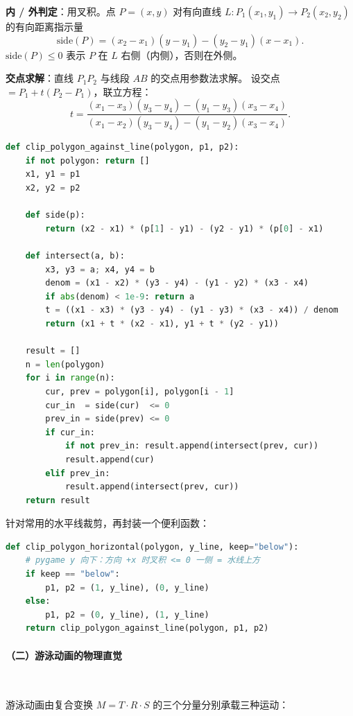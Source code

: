 \documentclass[12pt, a4paper]{article}
\begin{document}
\textbf{内 / 外判定}：用叉积。点 $P = (x, y)$ 对有向直线
$L: P_1(x_1, y_1) \to P_2(x_2, y_2)$ 的有向距离指示量
\[
\mathrm{side}(P) = (x_2 - x_1)(y - y_1) - (y_2 - y_1)(x - x_1).
\]
$\mathrm{side}(P) \le 0$ 表示 $P$ 在 $L$ 右侧（内侧），否则在外侧。

\textbf{交点求解}：直线 $P_1 P_2$ 与线段 $A B$ 的交点用参数法求解。
设交点 $= P_1 + t(P_2 - P_1)$，联立方程：
\[
t = \frac{(x_1 - x_3)(y_3 - y_4) - (y_1 - y_3)(x_3 - x_4)}
        {(x_1 - x_2)(y_3 - y_4) - (y_1 - y_2)(x_3 - x_4)}.
\]

\begin{lstlisting}[language=Python, caption={Sutherland--Hodgman 裁剪（algorithms.py 摘录）}]
def clip_polygon_against_line(polygon, p1, p2):
    if not polygon: return []
    x1, y1 = p1
    x2, y2 = p2

    def side(p):
        return (x2 - x1) * (p[1] - y1) - (y2 - y1) * (p[0] - x1)

    def intersect(a, b):
        x3, y3 = a; x4, y4 = b
        denom = (x1 - x2) * (y3 - y4) - (y1 - y2) * (x3 - x4)
        if abs(denom) < 1e-9: return a
        t = ((x1 - x3) * (y3 - y4) - (y1 - y3) * (x3 - x4)) / denom
        return (x1 + t * (x2 - x1), y1 + t * (y2 - y1))

    result = []
    n = len(polygon)
    for i in range(n):
        cur, prev = polygon[i], polygon[i - 1]
        cur_in  = side(cur)  <= 0
        prev_in = side(prev) <= 0
        if cur_in:
            if not prev_in: result.append(intersect(prev, cur))
            result.append(cur)
        elif prev_in:
            result.append(intersect(prev, cur))
    return result
\end{lstlisting}

针对常用的水平线裁剪，再封装一个便利函数：

\begin{lstlisting}[language=Python, caption={水平线裁剪封装}]
def clip_polygon_horizontal(polygon, y_line, keep="below"):
    # pygame y 向下：方向 +x 时叉积 <= 0 一侧 = 水线上方
    if keep == "below":
        p1, p2 = (1, y_line), (0, y_line)
    else:
        p1, p2 = (0, y_line), (1, y_line)
    return clip_polygon_against_line(polygon, p1, p2)
\end{lstlisting}

\paragraph{（二）游泳动画的物理直觉}~

游泳动画由复合变换 $M = T \cdot R \cdot S$ 的三个分量分别承载三种运动：
\end{document}
